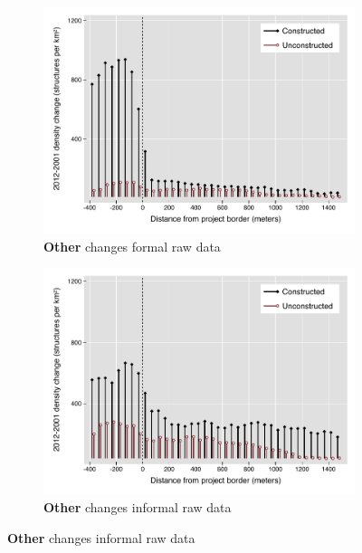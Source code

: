 \documentclass[12pt]{article}
\begin{document}
\begin{figure}
\begin{subfigure}[b]{0.48\textwidth}
        \end{subfigure}
        \begin{subfigure}[b]{0.48\textwidth}
                    \caption[Network2]%
            {{\footnotesize \textbf{Other} changes formal raw data}}   
            \label{fig:prefor}
            \centering
            \includegraphics[width=\textwidth,trim={0.3cm .3cm 0.1cm 0cm}, clip=true]{figures/bblu_for_rawchanges_4_3_30k.pdf}

        \end{subfigure}
        \hfill
        \begin{subfigure}[b]{0.48\textwidth} 
                    \caption[]%
            {{\footnotesize \textbf{Other} changes informal  raw data}}      
            \label{fig:preinf} 
            \centering 
            \includegraphics[width=\textwidth,trim={0.3cm .3cm 0.1cm 0cm}, clip=true]{figures/bblu_inf_rawchanges_4_3_30k.pdf}

        \end{subfigure}
\end{figure}
\end{document}
